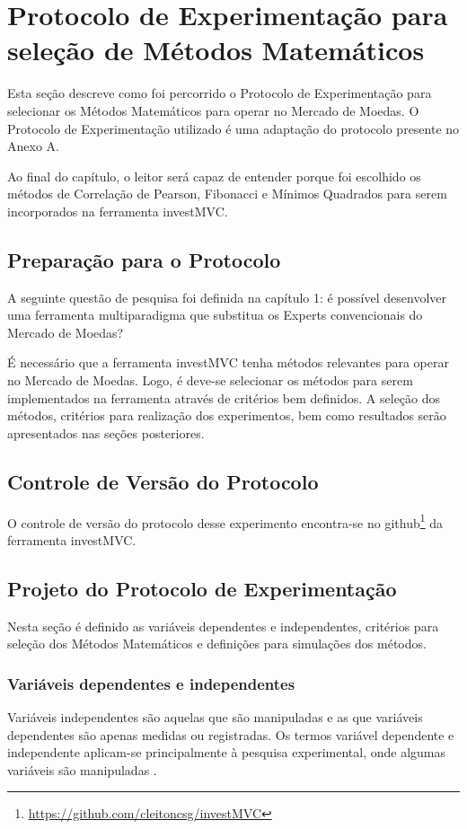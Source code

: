 \chapter{Protocolo de Experimentação para seleção de Métodos Matemáticos}

Esta seção descreve como foi percorrido o Protocolo de Experimentação para selecionar os Métodos Matemáticos para operar no Mercado de Moedas. O Protocolo de Experimentação utilizado é uma adaptação do protocolo presente no Anexo A.

Ao final do capítulo, o leitor será capaz de entender porque foi escolhido os métodos de Correlação de Pearson, Fibonacci e Mínimos Quadrados para serem incorporados na ferramenta investMVC.

\section{Preparação para o Protocolo}

A seguinte questão de pesquisa foi definida na capítulo 1: é possível desenvolver uma ferramenta multiparadigma que substitua os Experts convencionais do Mercado de Moedas? 

É necessário que a ferramenta investMVC tenha métodos relevantes para operar no Mercado de Moedas. Logo, é deve-se selecionar os métodos para serem implementados na ferramenta através de critérios bem definidos. A seleção dos métodos, critérios para realização dos experimentos, bem como resultados serão apresentados nas seções posteriores.

\section{Controle de Versão do Protocolo}

O controle de versão do protocolo desse experimento encontra-se no github\footnote{\url{https://github.com/cleitoncsg/investMVC}} da ferramenta investMVC.

\section{Projeto do Protocolo de Experimentação}

Nesta seção é definido as variáveis dependentes e independentes, critérios para seleção dos Métodos Matemáticos e definições para simulações dos métodos.


\subsection{Variáveis dependentes e independentes}
Variáveis independentes são aquelas que são manipuladas e as que variáveis dependentes são apenas medidas ou registradas. Os termos variável dependente e independente aplicam-se principalmente à pesquisa experimental, onde algumas variáveis são manipuladas \cite[pág.~13]{hoppen2010}.

